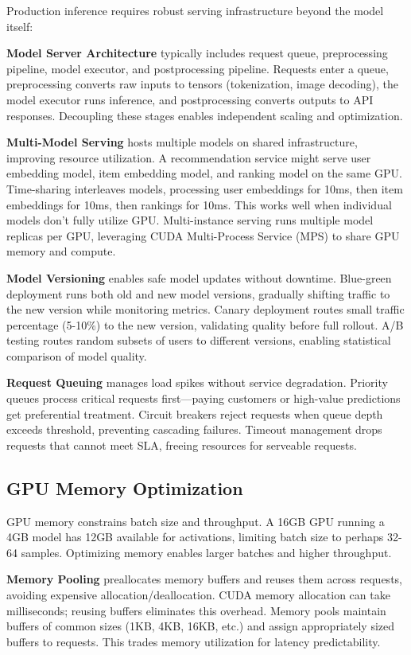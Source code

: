 Production inference requires robust serving infrastructure beyond the model itself:

\textbf{Model Server Architecture} typically includes request queue, preprocessing pipeline, model executor, and postprocessing pipeline. Requests enter a queue, preprocessing converts raw inputs to tensors (tokenization, image decoding), the model executor runs inference, and postprocessing converts outputs to API responses. Decoupling these stages enables independent scaling and optimization.

\textbf{Multi-Model Serving} hosts multiple models on shared infrastructure, improving resource utilization. A recommendation service might serve user embedding model, item embedding model, and ranking model on the same GPU. Time-sharing interleaves models, processing user embeddings for 10ms, then item embeddings for 10ms, then rankings for 10ms. This works well when individual models don't fully utilize GPU. Multi-instance serving runs multiple model replicas per GPU, leveraging CUDA Multi-Process Service (MPS) to share GPU memory and compute.

\textbf{Model Versioning} enables safe model updates without downtime. Blue-green deployment runs both old and new model versions, gradually shifting traffic to the new version while monitoring metrics. Canary deployment routes small traffic percentage (5-10\%) to the new version, validating quality before full rollout. A/B testing routes random subsets of users to different versions, enabling statistical comparison of model quality.

\textbf{Request Queuing} manages load spikes without service degradation. Priority queues process critical requests first---paying customers or high-value predictions get preferential treatment. Circuit breakers reject requests when queue depth exceeds threshold, preventing cascading failures. Timeout management drops requests that cannot meet SLA, freeing resources for serveable requests.

\subsection{GPU Memory Optimization}

GPU memory constrains batch size and throughput. A 16GB GPU running a 4GB model has 12GB available for activations, limiting batch size to perhaps 32-64 samples. Optimizing memory enables larger batches and higher throughput.

\textbf{Memory Pooling} preallocates memory buffers and reuses them across requests, avoiding expensive allocation/deallocation. CUDA memory allocation can take milliseconds; reusing buffers eliminates this overhead. Memory pools maintain buffers of common sizes (1KB, 4KB, 16KB, etc.) and assign appropriately sized buffers to requests. This trades memory utilization for latency predictability.

